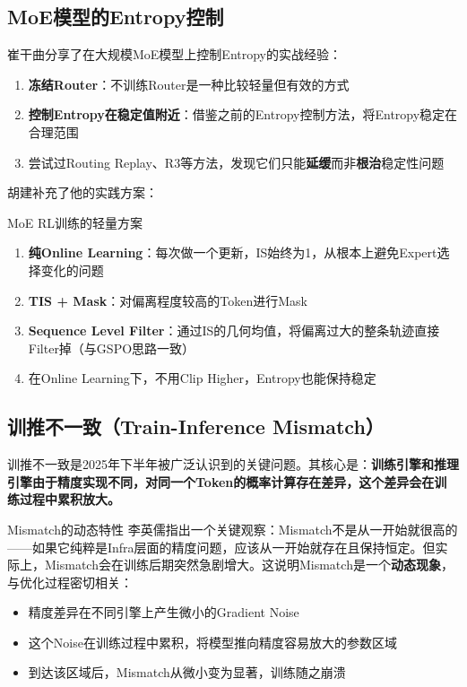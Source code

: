 \subsection{MoE模型的Entropy控制}

崔干曲分享了在大规模MoE模型上控制Entropy的实战经验：

\begin{enumerate}
    \item \textbf{冻结Router}：不训练Router是一种比较轻量但有效的方式
    \item \textbf{控制Entropy在稳定值附近}：借鉴之前的Entropy控制方法，将Entropy稳定在合理范围
    \item 尝试过Routing Replay、R3等方法，发现它们只能\textbf{延缓}而非\textbf{根治}稳定性问题
\end{enumerate}

胡建补充了他的实践方案：

\begin{importantbox}{MoE RL训练的轻量方案}
\begin{enumerate}
    \item \textbf{纯Online Learning}：每次做一个更新，IS始终为1，从根本上避免Expert选择变化的问题
    \item \textbf{TIS + Mask}：对偏离程度较高的Token进行Mask
    \item \textbf{Sequence Level Filter}：通过IS的几何均值，将偏离过大的整条轨迹直接Filter掉（与GSPO思路一致）
    \item 在Online Learning下，不用Clip Higher，Entropy也能保持稳定
\end{enumerate}
\end{importantbox}

\subsection{训推不一致（Train-Inference Mismatch）}

训推不一致是2025年下半年被广泛认识到的关键问题。其核心是：\textbf{训练引擎和推理引擎由于精度实现不同，对同一个Token的概率计算存在差异，这个差异会在训练过程中累积放大。}

\begin{warningbox}{Mismatch的动态特性}
李英儒指出一个关键观察：Mismatch不是从一开始就很高的——如果它纯粹是Infra层面的精度问题，应该从一开始就存在且保持恒定。但实际上，Mismatch会在训练后期突然急剧增大。这说明Mismatch是一个\textbf{动态现象}，与优化过程密切相关：
\begin{itemize}
    \item 精度差异在不同引擎上产生微小的Gradient Noise
    \item 这个Noise在训练过程中累积，将模型推向精度容易放大的参数区域
    \item 到达该区域后，Mismatch从微小变为显著，训练随之崩溃
\end{itemize}
\end{warningbox}

